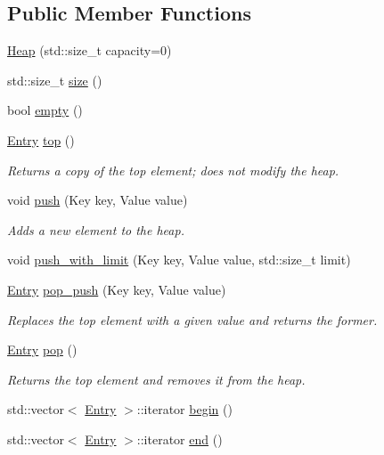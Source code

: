 \subsection*{Public Member Functions}
\begin{DoxyCompactItemize}
\item 
\hyperlink{classbloodhound_1_1Heap_a4bfb303b963ce1fb618fe52f1c594548}{Heap} (std\+::size\+\_\+t capacity=0)
\item 
std\+::size\+\_\+t \hyperlink{classbloodhound_1_1Heap_a747e3e3ebfe9c41ab9a37daa9af63212}{size} ()
\item 
bool \hyperlink{classbloodhound_1_1Heap_aac3a949dc1e68b9cb50256dd64b0dd0e}{empty} ()
\item 
\hyperlink{structbloodhound_1_1Heap_1_1Entry}{Entry} \hyperlink{classbloodhound_1_1Heap_af13e8e8fe8a0ae8f683421a79d97c30a}{top} ()
\begin{DoxyCompactList}\small\item\em Returns a copy of the top element; does not modify the heap. \end{DoxyCompactList}\item 
void \hyperlink{classbloodhound_1_1Heap_af1ded1a305b458eae6d759b6df657632}{push} (Key key, Value value)
\begin{DoxyCompactList}\small\item\em Adds a new element to the heap. \end{DoxyCompactList}\item 
void \hyperlink{classbloodhound_1_1Heap_ab4abf883beaba0f75992267a6fe31133}{push\+\_\+with\+\_\+limit} (Key key, Value value, std\+::size\+\_\+t limit)
\item 
\hyperlink{structbloodhound_1_1Heap_1_1Entry}{Entry} \hyperlink{classbloodhound_1_1Heap_a211e187399a6b25d77a6daf309dc4dd0}{pop\+\_\+push} (Key key, Value value)
\begin{DoxyCompactList}\small\item\em Replaces the top element with a given value and returns the former. \end{DoxyCompactList}\item 
\hyperlink{structbloodhound_1_1Heap_1_1Entry}{Entry} \hyperlink{classbloodhound_1_1Heap_a8dd7cfa3a7829bafe05a407c36160574}{pop} ()
\begin{DoxyCompactList}\small\item\em Returns the top element and removes it from the heap. \end{DoxyCompactList}\item 
std\+::vector$<$ \hyperlink{structbloodhound_1_1Heap_1_1Entry}{Entry} $>$\+::iterator \hyperlink{classbloodhound_1_1Heap_a4f854be1d5a292ee3854373367ca89f3}{begin} ()
\item 
std\+::vector$<$ \hyperlink{structbloodhound_1_1Heap_1_1Entry}{Entry} $>$\+::iterator \hyperlink{classbloodhound_1_1Heap_acf2ab6a5ec00cd57632c5cee032cb15d}{end} ()
\end{DoxyCompactItemize}


